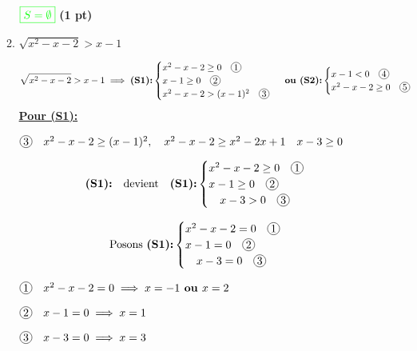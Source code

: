 \documentclass[12pt,a4paper]{article}
\begin{document}
\begin{enumerate}
\begin{enumerate}
\begin{flushleft}
\end{flushleft}
\begin{center}
\(
\textcolor{green}{\boxed{S = \emptyset }} 
\)  \hfill \textbf{(1 pt)}
\end{center}

\item \( \sqrt{x^{2}-x-2} > x-1 \)

\[
\sqrt{x^2 - x - 2} > x - 1 \implies \textbf{(S1):}
\begin{cases}
x^2 - x - 2 \geq 0 \quad \encercle{1} \\
x - 1 \geq 0 \quad \encercle{2} \\
x^2 - x - 2 > (x-1)^2 \quad \encercle{3}
\end{cases}\textbf{ ou }
\textbf{(S2):}\begin{cases}
x - 1 < 0 \quad \encercle{4} \\
x^2 - x - 2 \geq 0 \quad \encercle{5}
\end{cases}
\]
\underline{\textbf{Pour (S1):}}

\(
\encercle{3}\quad x^2 - x - 2 \geq (x-1)^2 , \\
\quad x^2 - x - 2 \geq x^{2}-2x+1\\
\quad x - 3 \geq 0
\)


\[\textbf{(S1):} \quad \text{devient} \quad \textbf{(S1):}
\begin{cases}
x^2 - x - 2 \geq 0  \quad \encercle{1}\\
x - 1 \geq 0  \quad \encercle{2}\\
\quad x - 3 > 0 \quad \encercle{3}
\end{cases}
\]

\[\text{Posons }\textbf{(S1):}
\begin{cases}
x^2 - x - 2 = 0  \quad \encercle{1}\\
x - 1  = 0 \quad \encercle{2}\\
\quad x - 3 = 0 \quad \encercle{3}
\end{cases}
\]

\(\encercle{1} \quad x^2 - x - 2 = 0 \implies x=-1 \textbf{ ou } x=2\)

\(\encercle{2} \quad x - 1 = 0 \implies x=1 \)

\(\encercle{3} \quad x - 3 = 0 \implies x=3 \)
\begin{flushleft}
\end{flushleft}
\end{enumerate}
\end{enumerate}
\end{document}
